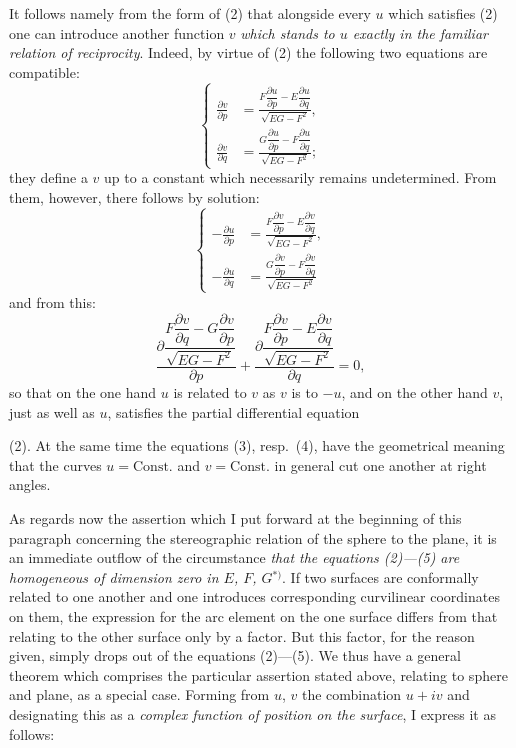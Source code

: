 \documentclass{article}
\begin{document}
It follows namely from the form of (2)\uncertain{;} that alongside every $u$ which satisfies (2) one can introduce another function $v$ \emph{which stands to $u$ exactly in the familiar relation of reciprocity}. Indeed, by virtue of (2) the following two equations are compatible:
\[ \left\{ \begin{aligned} \frac{\partial v}{\partial p} &= \frac{F\dfrac{\partial u}{\partial p} - E\dfrac{\partial u}{\partial q}}{\sqrt{EG - F^{2}}}, \\ \frac{\partial v}{\partial q} &= \frac{G\dfrac{\partial u}{\partial p} - F\dfrac{\partial u}{\partial q}}{\sqrt{EG - F^{2}}}; \end{aligned} \right. \tag{3} \]
they define a $v$ up to a constant which necessarily remains undetermined. From them, however, there follows by solution:
\[ \left\{ \begin{aligned} -\frac{\partial u}{\partial p} &= \frac{F\dfrac{\partial v}{\partial p} - E\dfrac{\partial v}{\partial q}}{\sqrt{EG - F^{2}}}, \\ -\frac{\partial u}{\partial q} &= \frac{G\dfrac{\partial v}{\partial p} - F\dfrac{\partial v}{\partial q}}{\sqrt{EG - F^{2}}} \end{aligned} \right. \tag{4} \]
and from this:
\[ \frac{\partial \dfrac{F\dfrac{\partial v}{\partial q} - G\dfrac{\partial v}{\partial p}}{\sqrt{EG - F^{2}}}}{\partial p} + \frac{\partial \dfrac{F\dfrac{\partial v}{\partial p} - E\dfrac{\partial v}{\partial q}}{\sqrt{EG - F^{2}}}}{\partial q} = 0, \tag{5} \]
so that on the one hand $u$ is related to $v$ as $v$ is to $-u$, and on the other hand $v$, just as well as $u$, satisfies the partial differential equation

(2). At the same time the equations (3), resp.~(4), have the geometrical meaning that the curves $u = \text{Const.}$ and $v = \text{Const.}$ in general cut one another at right angles.

As regards now the assertion which I put forward at the beginning of this paragraph concerning the stereographic relation of the sphere to the plane, it is an immediate outflow of the circumstance \emph{that the equations (2)---(5) are homogeneous of dimension zero in $E$, $F$, $G$}${}^{*)}$. If two surfaces are conformally related to one another and one introduces corresponding curvilinear coordinates on them, the expression for the arc element on the one surface differs from that relating to the other surface only by a factor. But this factor, for the reason given, simply drops out of the equations (2)---(5). We thus have a general theorem which comprises the particular assertion stated above, relating to sphere and plane, as a special case. Forming from $u$, $v$ the combination $u + iv$ and designating this as a \emph{complex function of position on the surface}, I express it as follows:
\end{document}
